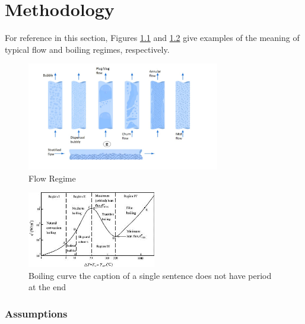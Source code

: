 \documentclass[compileTAMUreport.tex]{subfiles}
\begin{document}
\chapter{Methodology}

For reference in this section, Figures \ref{fig:flowregime} and \ref{fig:boilingregime} give examples of the meaning of typical flow and boiling regimes, respectively.

\begin{figure}[H]
\begin{center}
\includegraphics[width=0.75\textwidth]{./figure/flow_regime}
\end{center}
\caption{Flow Regime}
\label{fig:flowregime}
\end{figure}

\begin{figure}[H]
\centering
\includegraphics[width=0.5\textwidth]{./figure/400px-Boiling}
\caption{Boiling curve the caption of a single sentence does not have period at the end}
\label{fig:boilingregime}
\end{figure}

\subsection{Assumptions}
\end{document}
